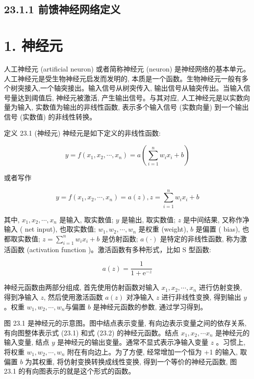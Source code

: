 \documentclass[10pt]{article}
\begin{document}
\begin{CJK*}{UTF8}{bsmi}
\subsection*{23.1.1 前馈神经网络定义}
\section*{1. 神经元}
人工神经元 (artificial neuron) 或者简称神经元 (neuron) 是神经网络的基本单元。人工神经元是受生物神经元启发而发明的, 本质是一个函数。生物神经元一般有多个树突接入,一个轴突接出。输入信号从树突传入, 输出信号从轴突传出。当输入信号量达到阈值后, 神经元被激活, 产生输出信号。与其对应, 人工神经元是以实数向量为输入, 实数值为输出的非线性函数, 表示多个输入信号 (实数向量) 到一个输出信号 (实数值) 的非线性转换。

定义 23.1 (神经元) 神经元是如下定义的非线性函数:


\begin{equation*}
y=f\left(x_{1}, x_{2}, \cdots, x_{n}\right)=a\left(\sum_{i=1}^{n} w_{i} x_{i}+b\right) \tag{23.1}
\end{equation*}


或者写作


\begin{equation*}
y=f\left(x_{1}, x_{2}, \cdots, x_{n}\right)=a(z), z=\sum_{i=1}^{n} w_{i} x_{i}+b \tag{23.2}
\end{equation*}


其中, $x_{1}, x_{2}, \cdots, x_{n}$ 是输入, 取实数值; $y$ 是输出, 取实数值; $z$ 是中间结果, 又称作净输入 ( net input), 也取实数值; $w_{1}, w_{2}, \cdots, w_{n}$ 是权重 (weight), $b$ 是偏置 ( bias), 也都取实数值; $z=\sum_{i=1}^{n} w_{i} x_{i}+b$ 是仿射函数; $a(\cdot)$ 是特定的非线性函数, 称为激活函数 (activation function )。激活函数有多种形式，比如 S 型函数:

$$
a(z)=\frac{1}{1+\mathrm{e}^{-z}}
$$

神经元函数由两部分组成, 首先使用仿射函数对输入 $x_{1}, x_{2}, \cdots, x_{n}$ 进行仿射变换, 得到净输入 $z$, 然后使用激活函数 $a(z)$ 对净输入 $z$ 进行非线性变换, 得到输出 $y$ 。权重 $w_{1}, w_{2}, \cdots, w_{n}$与偏置 $b$ 是神经元函数的参数, 通过学习得到。

图 23.1 是神经元的示意图。图中结点表示变量, 有向边表示变量之间的依存关系, 有向图整体表示式 (23.1) 和式 (23.2) 的神经元函数。结点 $x_{1}, x_{2}, \cdots x_{n}$ 是神经元的输入变量, 结点 $y$ 是神经元的输出变量。通常不显式表示净输入变量 $z$ 。习惯上, 将权重 $w_{1}, w_{2}, \cdots, w_{n}$ 附在有向边上。为了方便, 经常增加一个恒为 +1 的输入, 取偏置 $b$ 为其权重, 将仿射变换转换成线性变换, 得到一个等价的神经元函数, 图 23.1 的有向图表示的就是这个形式的函数。


\end{CJK*}
\end{document}
